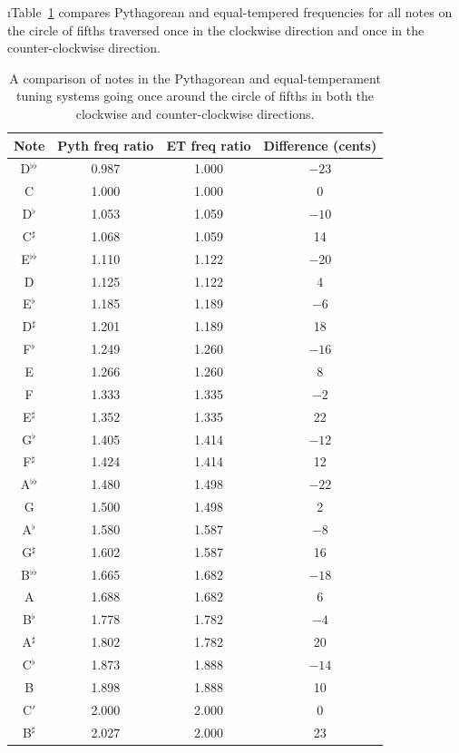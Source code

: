 \i Table~\ref{t:pyth_vs_ET} compares Pythagorean and
equal-tempered frequencies for all notes on the 
circle of fifths traversed once in the clockwise direction
and once in the counter-clockwise direction.
%
\begin{table}[htbp]
\begin{center}
\begin{tabular}{|c|c|c|c|}
\hline
Note & Pyth freq ratio & ET freq ratio & Difference (cents) \\
\hline
D$^{\flat\flat}$ & 0.987 & 1.000 & $-23$ \\
C & 1.000 & 1.000 & 0 \\
D$^\flat$ & 1.053 & 1.059 & $-10$ \\
C$^\sharp$ & 1.068 & 1.059 & 14 \\
E$^{\flat\flat}$ & 1.110 & 1.122 & $-20$ \\
D & 1.125 & 1.122 & 4 \\
E$^\flat$ & 1.185 & 1.189 & $-6$ \\
D$^\sharp$ & 1.201 & 1.189 & 18 \\
F$^\flat$ & 1.249 & 1.260 & $-16$ \\
E & 1.266 & 1.260 & 8 \\
F & 1.333 & 1.335 & $-2$ \\
E$^\sharp$ & 1.352 & 1.335 & 22 \\
G$^\flat$ & 1.405 & 1.414 & $-12$ \\
F$^\sharp$ & 1.424 & 1.414 & 12 \\
A$^{\flat\flat}$ & 1.480 & 1.498 & $-22$ \\
G & 1.500 & 1.498 & 2 \\
A$^\flat$ & 1.580 & 1.587 & $-8$ \\
G$^\sharp$ & 1.602 & 1.587 & 16 \\
B$^{\flat\flat}$ & 1.665 & 1.682 & $-18$ \\
A & 1.688 & 1.682 & 6 \\
B$^\flat$ & 1.778 & 1.782 & $-4$ \\
A$^\sharp$ & 1.802 & 1.782 & 20 \\
C$^\flat$ & 1.873 & 1.888 & $-14$ \\
B & 1.898 & 1.888 & 10 \\
C$'$ & 2.000 & 2.000 & 0 \\
B$^\sharp$ & 2.027 & 2.000 & 23 \\
\hline
\end{tabular}
\caption{A comparison of notes in the Pythagorean 
and equal-temperament tuning systems going once around
the circle of fifths in both the clockwise and 
counter-clockwise directions.}
\label{t:pyth_vs_ET}
\end{center}
\end{table}

